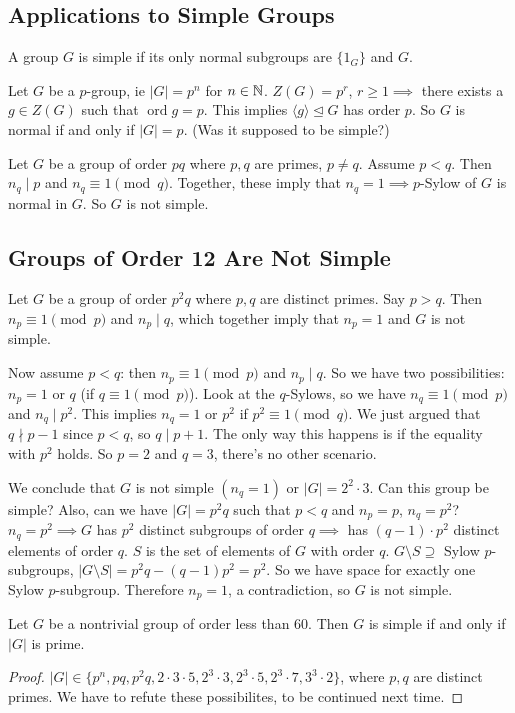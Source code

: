 \subsection{Applications to Simple Groups}
\begin{definition}
    A group $G$ is simple if its only normal subgroups are $\{1_G\} $ and $G$.
\end{definition}
\begin{example}
    Let $G$ be a $p$-group, ie $|G|=p^{n}$ for $n\in \mathbb{N}$. $Z(G)=p^{r}$, $r\geq 1\implies $ there exists a $g\in Z(G)$ such that $\operatorname{ord}g=p$. This implies $\langle g \rangle \trianglelefteq G$ has order $p$. So $G$ is normal if and only if $|G|=p$. (Was it supposed to be simple?)
\end{example}
\begin{example}
    Let $G$ be a group of order $pq$ where $p,q$ are primes, $p\neq q$. Assume $p< q$. Then $n_q \mid p$ and $n_q \equiv 1\pmod q$. Together, these imply that $n_q=1 \implies p$-Sylow of $G$ is normal in $G$. So $G$ is not simple.
\end{example}

\subsection{Groups of Order 12 Are Not Simple}
\begin{example}
    Let $G$ be a group of order $p^2q$ where $p,q$ are distinct primes. Say $p>q$. Then $n_p\equiv 1 \pmod p$ and $n_p \mid q$, which together imply that   $n_p=1$ and $G$ is not simple. 

    Now assume $p<q$: then $n_p\equiv 1\pmod p$ and $n_p \mid q$. So we have two possibilities: $n_p=1$ or $q$ (if $q\equiv 1\pmod p$). Look at the $q$-Sylows, so we have $n_q\equiv 1 \pmod p$ and $n_q \mid p^2$. This implies $n_q=1$ or $p^2$ if $p^2\equiv 1\pmod q$. We just argued that $q\nmid p-1$ since $p<q$, so $q \mid p+1$. The only way this happens is if the equality with $p^2$ holds. So $p=2$ and $q=3$, there's no other scenario.

    We conclude that $G$ is not simple $(n_q=1)$ or $|G|=2^2\cdot 3$. Can this group be simple? Also, can we have $|G|=p^2q$ such that $p<q$ and $n_p=p$, $n_q=p^2$? $n_q=p^2\implies G$ has $p^2$ distinct subgroups of order $q\implies $ has $(q-1)\cdot p^2$ distinct elements of order $q$.  $S$ is the set of elements of $G$ with order $q$. $G\setminus S\supseteq$ Sylow $p$-subgroups, $|G\setminus S|=p^2q-(q-1)p^2=p^2$. So we have space for exactly one Sylow $p$-subgroup. Therefore $n_p=1$, a contradiction, so $G$ is not simple.
\end{example}
\begin{cor}
    Let $G$ be a nontrivial group of order less than 60. Then $G$ is simple if and only if $|G|$ is prime.
\end{cor}
\begin{proof}
    $|G|\in \{p^{n},pq,p^2q,2\cdot 3\cdot 5,2^3\cdot 3,2^3\cdot 5,2^3\cdot 7,3^3\cdot 2\} $, where $p,q$ are distinct primes. We have to refute these possibilites, to be continued next time.
\end{proof}
